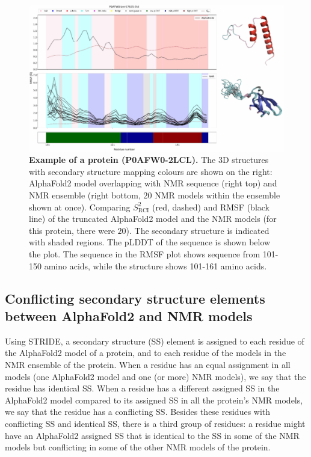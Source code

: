 \begin{figure}[H]
    \centering
    \includegraphics[width=\linewidth]{pLDDT//plddt_figures//supplementary_bhawna/supfig23.pdf}
    \caption{\textbf{Example of a protein (P0AFW0-2LCL).} The 3D structures with secondary structure mapping colours are shown on the right: AlphaFold2 model overlapping with NMR sequence (right top) and NMR ensemble (right bottom, $20$ NMR models within the ensemble shown at once). Comparing $S_{\text{RCI}}^{2}$ (red, dashed) and RMSF (black line) of the truncated AlphaFold2 model and the NMR models (for this protein, there were $20$). The secondary structure is indicated with shaded regions. The pLDDT of the sequence is shown below the plot. The sequence in the RMSF plot shows sequence from 101-150 amino acids, while the structure shows 101-161 amino acids.}
    \label{fig:plddt_sup:sup23}
\end{figure}

\subsection*{Conflicting secondary structure elements between AlphaFold2 and NMR models}

Using STRIDE, a secondary structure (SS) element is assigned to each residue of the AlphaFold2 model of a protein, and to each residue of the models in the NMR ensemble of the protein. When a residue has an equal assignment in all models (one AlphaFold2 model and one (or more) NMR models), we say that the residue has identical SS. When a residue has a different assigned SS in the AlphaFold2 model compared to its assigned SS in all the protein’s NMR models, we say that the residue has a conflicting SS. Besides these residues with conflicting SS and identical SS, there is a third group of residues: a residue might have an AlphaFold2 assigned SS that is identical to the SS in some of the NMR models but conflicting in some of the other NMR models of the protein.

